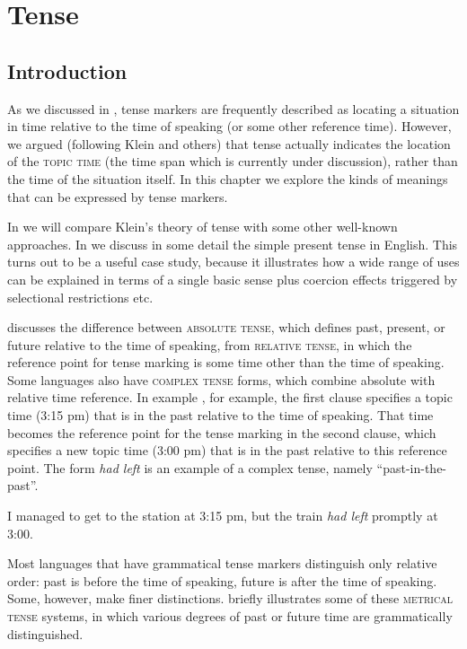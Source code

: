 \chapter{Tense}\label{sec:21}

\section{Introduction}\label{sec:21.1}

As we discussed in , tense markers are frequently described as locating a situation in time relative to the time of speaking (or some other reference time). However, we argued (following Klein and others) that tense actually indicates the location of the \textsc{topic time} (the time span which is currently under discussion), rather than the time of the situation itself. In this chapter we explore the kinds of meanings that can be expressed by tense markers.



In  we will compare Klein’s theory of tense with some other well-known approaches. In  we discuss in some detail the simple present tense in English. This turns out to be a useful case study, because it illustrates how a wide range of uses can be explained in terms of a single basic sense plus coercion effects triggered by selectional restrictions etc.



 discusses the difference between \textsc{absolute tense}, which defines past, present, or future relative to the time of speaking, from \textsc{relative tense}, in which the reference point for tense marking is some time other than the time of speaking. Some languages also have \textsc{complex tense} forms, which combine absolute with relative time reference. In example , for example, the first clause specifies a topic time (3:15 pm) that is in the past relative to the time of speaking. That time becomes the reference point for the tense marking in the second clause, which specifies a new topic time (3:00 pm) that is in the past relative to this reference point. The form \textit{had left} is an example of a complex tense, namely “past-in-the-past”.


\ea \label{ex:21.1}
I managed to get to the station at 3:15 pm, but the train \textit{had left} promptly at 3:00.
\z


Most languages that have grammatical tense markers distinguish only relative order: past is before the time of speaking, future is after the time of speaking. Some, however, make finer distinctions.  briefly illustrates some of these \textsc{metrical tense} systems, in which various degrees of past or future time are grammatically distinguished. 


